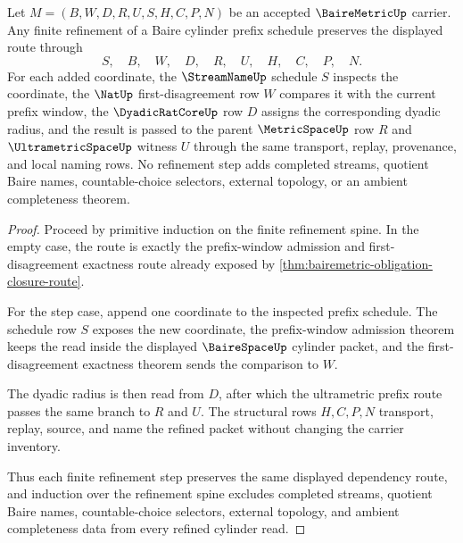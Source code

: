 \begin{theorem}
\label{thm:bairemetric-cylindrical-refinement-induction}
Let $M=(B,W,D,R,U,S,H,C,P,N)$ be an accepted $\BaireMetricUp$ carrier. Any finite refinement of a Baire cylinder prefix schedule preserves the displayed route through
$$
S,\quad B,\quad W,\quad D,\quad R,\quad U,\quad H,\quad C,\quad P,\quad N .
$$
For each added coordinate, the $\StreamNameUp$ schedule $S$ inspects the coordinate, the $\NatUp$ first-disagreement row $W$ compares it with the current prefix window, the $\DyadicRatCoreUp$ row $D$ assigns the corresponding dyadic radius, and the result is passed to the parent $\MetricSpaceUp$ row $R$ and $\UltrametricSpaceUp$ witness $U$ through the same transport, replay, provenance, and local naming rows. No refinement step adds completed streams, quotient Baire names, countable-choice selectors, external topology, or an ambient completeness theorem.
\end{theorem}
\begin{proof}
Proceed by primitive induction on the finite refinement spine. In the empty case, the route is exactly the prefix-window admission and first-disagreement exactness route already exposed by \autoref{thm:bairemetric-obligation-closure-route}.

For the step case, append one coordinate to the inspected prefix schedule. The schedule row $S$ exposes the new coordinate, the prefix-window admission theorem keeps the read inside the displayed $\BaireSpaceUp$ cylinder packet, and the first-disagreement exactness theorem sends the comparison to $W$.

The dyadic radius is then read from $D$, after which the ultrametric prefix route passes the same branch to $R$ and $U$. The structural rows $H,C,P,N$ transport, replay, source, and name the refined packet without changing the carrier inventory.

Thus each finite refinement step preserves the same displayed dependency route, and induction over the refinement spine excludes completed streams, quotient Baire names, countable-choice selectors, external topology, and ambient completeness data from every refined cylinder read.
\end{proof}


